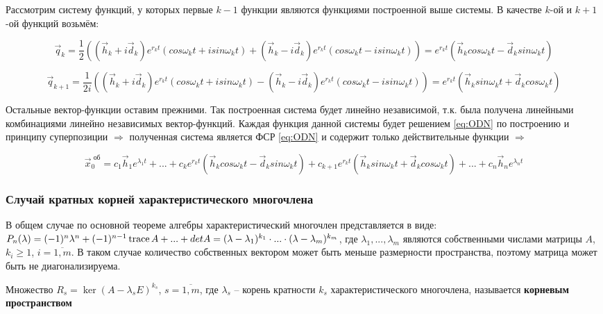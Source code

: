 Рассмотрим систему функций, у которых первые $k-1$ функции являются функциями построенной выше системы. В качестве $k$-ой и $k+1$-ой функций возьмём:

\[
   \vec{q}_k = \frac{1}{2}((\vec{h}_k + i \vec{d}_k) e^{r_k t} (cos \omega_k t + i sin \omega_k t) + (\vec{h}_k - i \vec{d}_k) e^{r_k t} (cos \omega_k t - i sin \omega_k t)) = e^{r_k t} (\vec{h}_k cos \omega_k t - \vec{d}_k sin \omega_k t)
\]

\[
   \vec{q}_{k+1} = \frac{1}{2i}((\vec{h}_k + i \vec{d}_k) e^{r_k t} (cos \omega_k t + i sin \omega_k t) - (\vec{h}_k - i \vec{d}_k) e^{r_k t} (cos \omega_k t - i sin \omega_k t)) = e^{r_k t} (\vec{h}_k sin \omega_k t + \vec{d}_k cos \omega_k t)
\]

Остальные вектор-функции оставим прежними. Так построенная система будет линейно независимой, т.к. была получена линейными комбинациями линейно независимых вектор-функций. Каждая функция данной системы будет решением \eqref{eq:ODN} по построению и принципу суперпозиции $\Rightarrow$ полученная система является ФСР \eqref{eq:ODN} и содержит только действительные функции $\Rightarrow$ 

\begin{equation*}
  \boxed{\vec{x}^{\text{ об}}_0 = c_1 \vec{h}_1 e^{\lambda_1 t} + ...+ c_k e^{r_k t} (\vec{h}_k cos \omega_k t - \vec{d}_k sin \omega_k t) + c_{k+1} e^{r_k t} (\vec{h}_k sin \omega_k t + \vec{d}_k cos \omega_k t) + ... + c_n \vec{h}_n e^{\lambda_n t}}
\end{equation*}

\subsubsection*{Случай кратных корней характеристического многочлена}

В общем случае по основной теореме алгебры характеристический многочлен представляется в виде: 
$P_n (\lambda) = (-1)^n \lambda^n + (-1)^{n-1}\operatorname{trace} A + ... + det A = (\lambda - \lambda_1)^{k_1} \cdot ... \cdot (\lambda - \lambda_m)^{k_m}$, 
где $\lambda_1, ..., \lambda_m$ являются собственными числами матрицы $A$, $k_i \geq 1$, $i = \overline{1, m}$. 
В таком случае количество собственных вектором может быть меньше размерности пространства, поэтому матрица может быть не диагонализируема.

\begin{definition}
  Множество $R_s = \ker (A - \lambda_s E)^{k_s}$, $s = \overline{1, m}$, где $\lambda_s$ -- корень кратности $k_s$ характеристического многочлена, называется \textbf{корневым пространством}
\end{definition}


